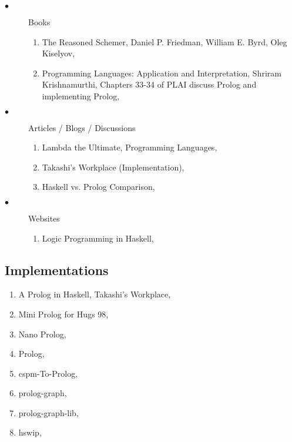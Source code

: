 \documentclass[proposal.tex]{subfiles}
\begin{document}
\begin{description}
\item[$\bullet$] Books
\begin{enumerate}
\item  The Reasoned Schemer, Daniel P. Friedman, William E. Byrd, Oleg Kiselyov, \cite{friedman05reasoned}

\item Programming Languages: Application and Interpretation, Shriram Krishnamurthi, Chapters 33-34 of PLAI discuss Prolog and implementing Prolog, \cite{krishnamurthi2007programming}

\end{enumerate}

\item[$\bullet$] Articles / Blogs / Discussions
\begin{enumerate}
\item Lambda the Ultimate, Programming Languages, \cite{website:lambda-the-ultimate}

\item Takashi's Workplace (Implementation), \cite{website:takashi-workplace}

\item Haskell vs. Prolog Comparison, \cite{website:stackoverflow}
 
\end{enumerate}

\item[$\bullet$] Websites
\begin{enumerate}

\item Logic Programming in Haskell, \cite{website:logic-programming-haskell}

\end{enumerate}

\end{description}


\subsection{Implementations}
\begin{enumerate}
\item A Prolog in Haskell, Takashi's Workplace, \cite{website:takashi-workplace}

\item Mini Prolog for Hugs 98, \cite{website:mini-prolog-hugs98}

\item Nano Prolog, \cite{nanoprolog-lib}

\item Prolog, \cite{prolog-lib}

\item cspm-To-Prolog, \cite{cspm-To-Prolog-lib}

\item prolog-graph, \cite{prolog-graph-lib}

\item prolog-graph-lib, \cite{prolog-graph-lib-lib}

\item hswip, \cite{hswip-lib}

\end{enumerate}
\end{document}
